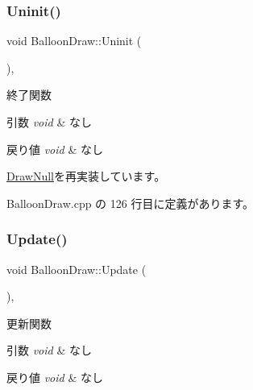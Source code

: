 \subsubsection{\texorpdfstring{Uninit()}{Uninit()}}
{\footnotesize\ttfamily void Balloon\+Draw\+::\+Uninit (\begin{DoxyParamCaption}{ }\end{DoxyParamCaption})\hspace{0.3cm}{\ttfamily [override]}, {\ttfamily [virtual]}}



終了関数 


\begin{DoxyParams}{引数}
{\em void} & なし \\
\hline
\end{DoxyParams}

\begin{DoxyRetVals}{戻り値}
{\em void} & なし \\
\hline
\end{DoxyRetVals}


\mbox{\hyperlink{class_draw_null_a6e81d63efab7333e8d0e8af99362a4d9}{Draw\+Null}}を再実装しています。



 Balloon\+Draw.\+cpp の 126 行目に定義があります。

\mbox{\label{class_balloon_draw_a9314af6e3458e87fcace44a11e33126f}} 
\subsubsection{\texorpdfstring{Update()}{Update()}}
{\footnotesize\ttfamily void Balloon\+Draw\+::\+Update (\begin{DoxyParamCaption}{ }\end{DoxyParamCaption})\hspace{0.3cm}{\ttfamily [override]}, {\ttfamily [virtual]}}



更新関数 


\begin{DoxyParams}{引数}
{\em void} & なし \\
\hline
\end{DoxyParams}

\begin{DoxyRetVals}{戻り値}
{\em void} & なし \\
\hline
\end{DoxyRetVals}


